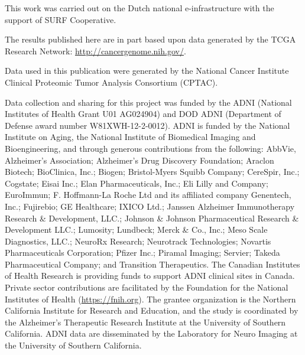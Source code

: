 This work was carried out on the Dutch national e-infrastructure with the support of SURF Cooperative.

The results published here are in part based upon data generated by the TCGA Research Network: \url{http://cancergenome.nih.gov/}.

Data used in this publication were generated by the National Cancer Institute Clinical Proteomic Tumor Analysis Consortium (CPTAC).

Data collection and sharing for this project was funded by the ADNI (National Institutes of Health Grant U01 AG024904) and DOD ADNI (Department of Defense award number W81XWH-12-2-0012).
ADNI is funded by the National Institute on Aging, the National Institute of Biomedical Imaging and Bioengineering, and through generous contributions from the following: AbbVie, Alzheimer's Association; Alzheimer's Drug Discovery Foundation; Araclon Biotech; BioClinica, Inc.; Biogen; Bristol-Myers Squibb Company; CereSpir, Inc.; Cogstate; Eisai Inc.; Elan Pharmaceuticals, Inc.; Eli Lilly and Company; EuroImmun; F. Hoffmann-La Roche Ltd and its affiliated company Genentech, Inc.; Fujirebio; GE Healthcare; IXICO Ltd.; Janssen Alzheimer Immunotherapy Research \& Development, LLC.; Johnson \& Johnson Pharmaceutical Research \& Development LLC.; Lumosity; Lundbeck; Merck \& Co., Inc.; Meso Scale Diagnostics, LLC.; NeuroRx Research; Neurotrack Technologies; Novartis Pharmaceuticals Corporation; Pfizer Inc.; Piramal Imaging; Servier; Takeda Pharmaceutical Company; and Transition Therapeutics. The Canadian Institutes of Health Research is providing funds to support ADNI clinical sites in Canada. Private sector contributions are facilitated by the Foundation for the National Institutes of Health (\url{https://fnih.org}). The grantee organization is the Northern California Institute for Research and Education, and the study is coordinated by the Alzheimer's Therapeutic Research Institute at the University of Southern California.
ADNI data are disseminated by the Laboratory for Neuro Imaging at the University of Southern California.



